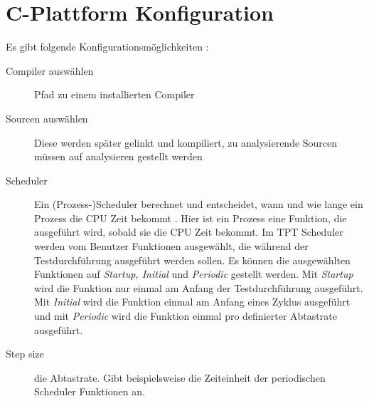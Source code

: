\section*{C-Plattform Konfiguration}
Es gibt folgende Konfigurationsmöglichkeiten \cite[vgl.][S. 862 ff.]{userguide}:
\begin{description}
\item[Compiler auswählen] Pfad zu einem installierten Compiler
\item[Sourcen auswählen] Diese werden später gelinkt und kompiliert, zu analysierende Sourcen müssen auf analysieren gestellt werden
\item[Scheduler] Ein (Prozess-)Scheduler berechnet und entscheidet, wann und wie lange ein Prozess die CPU Zeit bekommt \cite[vgl.][S. 44]{scheduler}.
Hier ist ein Prozess eine Funktion, die ausgeführt wird, sobald sie die CPU Zeit bekommt. %
Im TPT Scheduler werden vom Benutzer Funktionen ausgewählt, die während der Testdurchführung ausgeführt werden sollen.
Es können die ausgewählten Funktionen auf \textit{Startup, Initial} und \textit{Periodic} gestellt werden.
Mit \textit{Startup} wird die Funktion nur einmal am Anfang der Testdurchführung ausgeführt. Mit \textit{Initial} wird die Funktion
einmal am Anfang eines Zyklus ausgeführt und mit \textit{Periodic} wird die Funktion einmal pro definierter Abtastrate ausgeführt.
\item[Step size] die Abtastrate. Gibt beispielsweise die Zeiteinheit der periodischen Scheduler Funktionen an.
\end{description}
